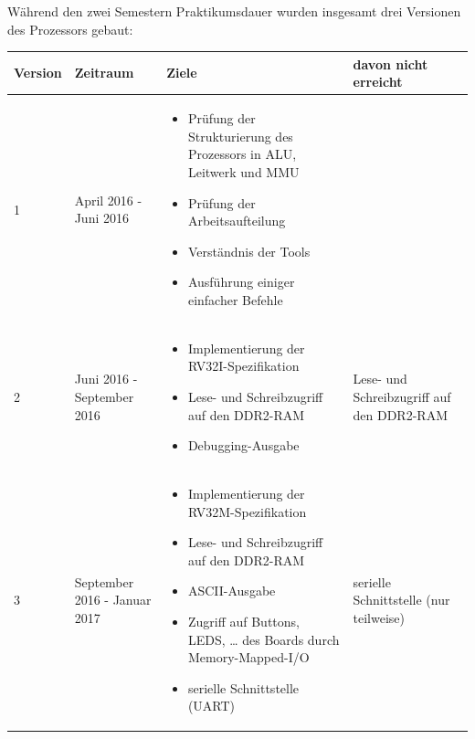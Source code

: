 W\"ahrend den zwei Semestern Praktikumsdauer wurden insgesamt drei Versionen
des Prozessors gebaut:

\begin{tabular}{|l|l|p{180pt}|l|}
\hline
Version & Zeitraum                     & Ziele                                                                            & davon nicht erreicht                          \\
\hline
1       & April 2016 - Juni 2016       & \begin{itemize}[noitemsep,topsep=0pt]
                                         \item Pr\"ufung der Strukturierung des Prozessors in ALU, Leitwerk und MMU
                                         \item Pr\"ufung der Arbeitsaufteilung
                                         \item Verst\"andnis der Tools
                                         \item Ausf\"uhrung einiger einfacher Befehle
                                         \end{itemize}                                                                    &                                               \\
\hline
2       & Juni 2016 - September 2016   & \begin{itemize}[noitemsep,topsep=0pt]
                                         \item Implementierung der RV32I-Spezifikation
                                         \item Lese- und Schreibzugriff auf den DDR2-RAM
                                         \item Debugging-Ausgabe
                                         \end{itemize}                                                                    & Lese- und Schreibzugriff auf den DDR2-RAM     \\
\hline
3       & September 2016 - Januar 2017 & \begin{itemize}[noitemsep,topsep=0pt]
                                         \item Implementierung der RV32M-Spezifikation
                                         \item Lese- und Schreibzugriff auf den DDR2-RAM
                                         \item ASCII-Ausgabe
                                         \item Zugriff auf Buttons, LEDS, \dots{} des Boards durch Memory-Mapped-I/O
                                         \item serielle Schnittstelle (UART)
                                         \end{itemize}                                                                    & serielle Schnittstelle (nur teilweise)        \\
\end{tabular}

